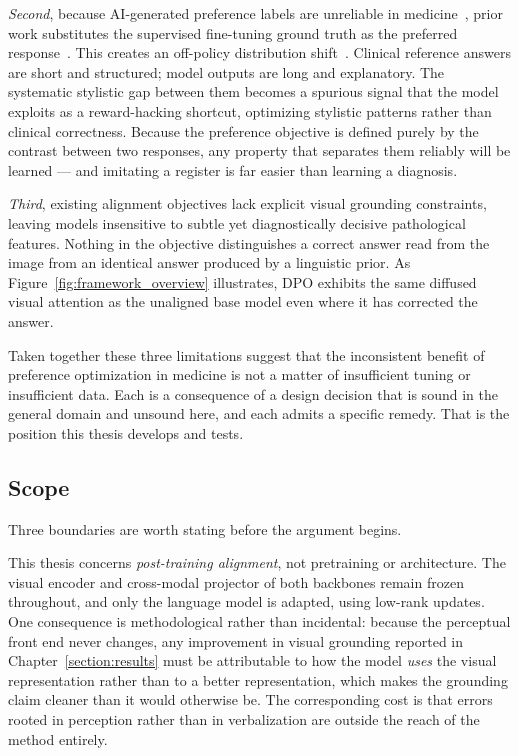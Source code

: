 \emph{Second}, because AI-generated preference labels are unreliable in medicine~\cite{delucia2026same, rankin2020reliability}, prior work substitutes the supervised fine-tuning ground truth as the preferred response~\cite{zhu2024mmedpo, liu2025rrg, savage2025fine}. This creates an off-policy distribution shift~\cite{yang2025mitigating}. Clinical reference answers are short and structured; model outputs are long and explanatory. The systematic stylistic gap between them becomes a spurious signal that the model exploits as a reward-hacking shortcut, optimizing stylistic patterns rather than clinical correctness. Because the preference objective is defined purely by the contrast between two responses, any property that separates them reliably will be learned --- and imitating a register is far easier than learning a diagnosis.

\emph{Third}, existing alignment objectives lack explicit visual grounding constraints, leaving models insensitive to subtle yet diagnostically decisive pathological features. Nothing in the objective distinguishes a correct answer read from the image from an identical answer produced by a linguistic prior. As Figure~\ref{fig:framework_overview} illustrates, DPO exhibits the same diffused visual attention as the unaligned base model even where it has corrected the answer.

Taken together these three limitations suggest that the inconsistent benefit of preference optimization in medicine is not a matter of insufficient tuning or insufficient data. Each is a consequence of a design decision that is sound in the general domain and unsound here, and each admits a specific remedy. That is the position this thesis develops and tests.

\subsection{Scope}
\label{sec:intro:scope}

Three boundaries are worth stating before the argument begins.

This thesis concerns \emph{post-training alignment}, not pretraining or architecture. The visual encoder and cross-modal projector of both backbones remain frozen throughout, and only the language model is adapted, using low-rank updates. One consequence is methodological rather than incidental: because the perceptual front end never changes, any improvement in visual grounding reported in Chapter~\ref{section:results} must be attributable to how the model \emph{uses} the visual representation rather than to a better representation, which makes the grounding claim cleaner than it would otherwise be. The corresponding cost is that errors rooted in perception rather than in verbalization are outside the reach of the method entirely.

